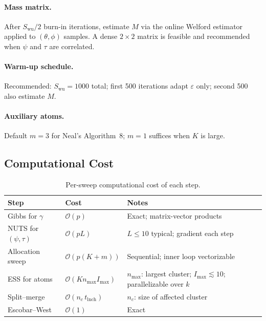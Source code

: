 \documentclass[12pt, a4paper]{article}
\theoremstyle{remark}
\begin{document}
\paragraph{Mass matrix.}
After $S_{\mathrm{wu}}/2$ burn-in iterations, estimate $M$ via the
online Welford estimator applied to $(\theta,\phi)$ samples.
A dense $2\times 2$ matrix is feasible and recommended when $\psi$
and $\tau$ are correlated.

\paragraph{Warm-up schedule.}
Recommended: $S_{\mathrm{wu}} = 1000$ total; first 500 iterations
adapt $\varepsilon$ only; second 500 also estimate $M$.

\paragraph{Auxiliary atoms.}
Default $m = 3$ for Neal's Algorithm~8; $m = 1$ suffices when $K$
is large.

\subsection{Computational Cost}

\begin{table}[h!]
\centering
\small
\caption{Per-sweep computational cost of each step.}
\label{tab:complexity}
\begin{tabular}{@{}llp{6.3cm}@{}}
\toprule
Step & Cost & Notes \\
\midrule
Gibbs for $\gamma$ & $\mathcal{O}(p)$ & Exact; matrix-vector products \\
NUTS for $(\psi,\tau)$ & $\mathcal{O}(pL)$ & $L \leq 10$ typical; gradient each step \\
Allocation sweep & $\mathcal{O}(p(K+m))$ & Sequential; inner loop vectorizable \\
ESS for atoms & $\mathcal{O}(K n_{\max} I_{\max})$ &
  $n_{\max}$: largest cluster; $I_{\max} \lesssim 10$;
  parallelizable over $k$ \\
Split--merge & $\mathcal{O}(n_c\,t_{\mathrm{lnch}})$ &
  $n_c$: size of affected cluster \\
Escobar--West & $\mathcal{O}(1)$ & Exact \\
\bottomrule
\end{tabular}
\end{table}
\end{document}
